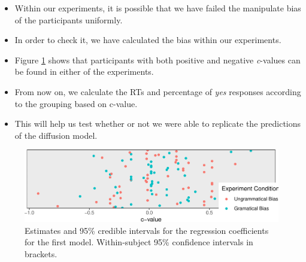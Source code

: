 \documentclass[
  10pt,
  english,
  doc,floatsintext]{apa6}
\providecommand{\tightlist}{%
  \setlength{\itemsep}{0pt}\setlength{\parskip}{0pt}}
\begin{document}
\begin{itemize}
\tightlist
\item
  Within our experiments, it is possible that we have failed the manipulate bias of the participants uniformly.
\item
  In order to check it, we have calculated the bias within our experiments.
\item
  Figure \ref{fig:Biasbyexperiment} shows that participants with both positive and negative \emph{c}-values can be found in either of the experiments.
\item
  From now on, we calculate the RTs and percentage of \emph{yes} responses according to the grouping based on c-value.
\item
  This will help us test whether or not we were able to replicate the predictions of the diffusion model.
\end{itemize}

\begin{figure}
\centering
\includegraphics{paperdraft_files/figure-latex/Biasbyexperiment-1.pdf}
\caption{\label{fig:Biasbyexperiment}Estimates and 95\% credible intervals for the regression coefficients for the first model. Within-subject 95\% confidence intervals in brackets.}
\end{figure}
\end{document}

